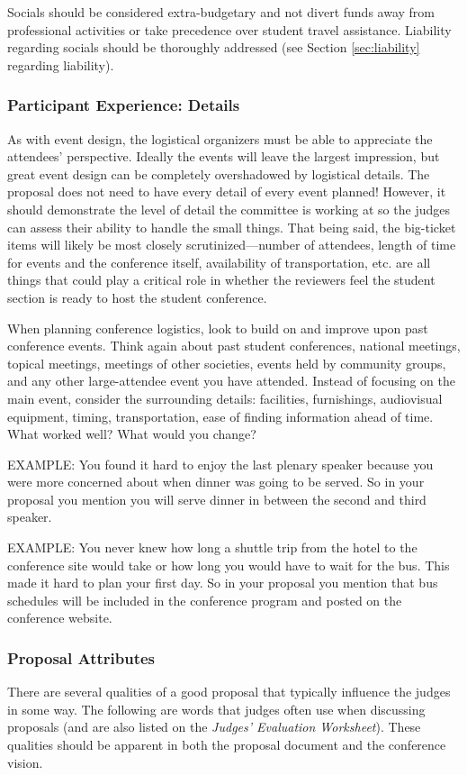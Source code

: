 \documentclass[12pt]{article}
\begin{document}
Socials should be considered extra-budgetary and not divert funds away from
professional activities or take precedence over student travel assistance. Liability regarding socials should be thoroughly addressed (see Section \ref{sec:liability} regarding liability).

\subsubsection{Participant Experience: Details}
As with event design, the logistical organizers must be able to appreciate the attendees’
perspective. Ideally the events will leave the largest impression, but great event design
can be completely overshadowed by logistical details. The proposal does not need to
have every detail of every event planned! However, it should demonstrate the level of
detail the committee is working at so the judges can assess their ability to handle the small things. That being said, the big-ticket items will likely be most closely scrutinized---number of attendees, length of time for events and the conference itself, availability of transportation, etc. are all things that could play a critical role in whether the reviewers feel the student section is ready to host the student conference.

When planning conference logistics, look to build on and improve upon past conference
events. Think again about past student conferences, national meetings, topical meetings,
meetings of other societies, events held by community groups, and any other large-attendee event you have attended. Instead of focusing on the main event, consider the
surrounding details: facilities, furnishings, audiovisual equipment, timing, transportation,
ease of finding information ahead of time. What worked well? What would you change?

EXAMPLE: You found it hard to enjoy the last plenary speaker because you were more
concerned about when dinner was going to be served. So in your proposal you mention
you will serve dinner in between the second and third speaker.

EXAMPLE: You never knew how long a shuttle trip from the hotel to the conference
site would take or how long you would have to wait for the bus. This made it hard to
plan your first day. So in your proposal you mention that bus schedules will be included
in the conference program and posted on the conference website.

\subsubsection{Proposal Attributes}
There are several qualities of a good proposal that typically influence the judges in some way. The following are
words that judges often use when discussing proposals (and are also listed on the \emph{Judges' Evaluation Worksheet}). These qualities should be
apparent in both the proposal document and the conference vision.
\end{document}
